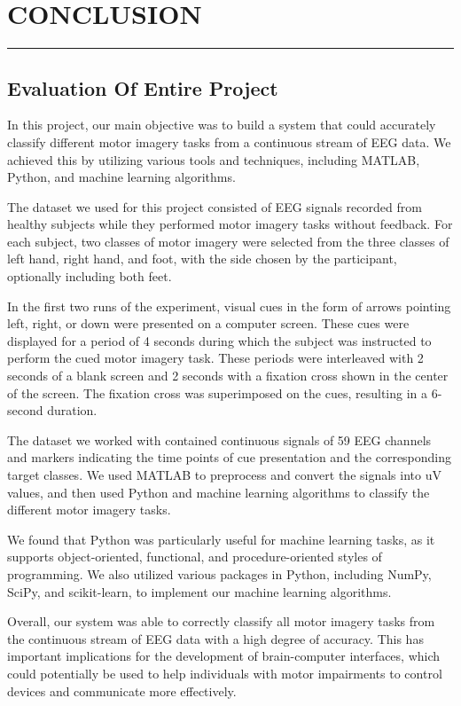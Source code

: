 \documentclass[12pt,a4paper]{report}
\begin{document}
	\chapter{CONCLUSION}
	\rule{14.6cm}{.05cm}
	\section{Evaluation Of Entire Project}
	\justify In this project, our main objective was to build a system that could accurately classify different motor imagery tasks from a continuous stream of EEG data. We achieved this by utilizing various tools and techniques, including MATLAB, Python, and machine learning algorithms.
	
	\justify The dataset we used for this project consisted of EEG signals recorded from healthy subjects while they performed motor imagery tasks without feedback. For each subject, two classes of motor imagery were selected from the three classes of left hand, right hand, and foot, with the side chosen by the participant, optionally including both feet.
	
	\justify In the first two runs of the experiment, visual cues in the form of arrows pointing left, right, or down were presented on a computer screen. These cues were displayed for a period of 4 seconds during which the subject was instructed to perform the cued motor imagery task. These periods were interleaved with 2 seconds of a blank screen and 2 seconds with a fixation cross shown in the center of the screen. The fixation cross was superimposed on the cues, resulting in a 6-second duration.
	
	\justify The dataset we worked with contained continuous signals of 59 EEG channels and markers indicating the time points of cue presentation and the corresponding target classes. We used MATLAB to preprocess and convert the signals into uV values, and then used Python and machine learning algorithms to classify the different motor imagery tasks.
	
	\justify We found that Python was particularly useful for machine learning tasks, as it supports object-oriented, functional, and procedure-oriented styles of programming. We also utilized various packages in Python, including NumPy, SciPy, and scikit-learn, to implement our machine learning algorithms.
	
	\justify Overall, our system was able to correctly classify all motor imagery tasks from the continuous stream of EEG data with a high degree of accuracy. This has important implications for the development of brain-computer interfaces, which could potentially be used to help individuals with motor impairments to control devices and communicate more effectively.
\end{document}

